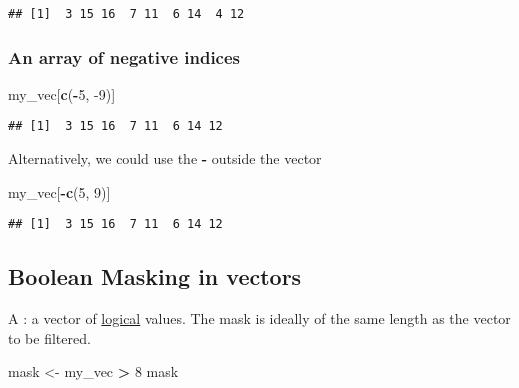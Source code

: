 \documentclass[]{book}
\newenvironment{Shaded}{\begin{snugshade}}{\end{snugshade}}
\newcommand{\DecValTok}[1]{\textcolor[rgb]{0.00,0.00,0.81}{#1}}
\newcommand{\KeywordTok}[1]{\textcolor[rgb]{0.13,0.29,0.53}{\textbf{#1}}}
\newcommand{\NormalTok}[1]{#1}
\newcommand{\OperatorTok}[1]{\textcolor[rgb]{0.81,0.36,0.00}{\textbf{#1}}}
\newcommand{\StringTok}[1]{\textcolor[rgb]{0.31,0.60,0.02}{#1}}
\begin{document}
\begin{verbatim}
## [1]  3 15 16  7 11  6 14  4 12
\end{verbatim}

\hypertarget{negvec}{%
\subsubsection*{An array of negative indices}\label{negvec}}

\begin{Shaded}
\begin{Highlighting}[]
\NormalTok{my_vec[}\KeywordTok{c}\NormalTok{(}\OperatorTok{-}\DecValTok{5}\NormalTok{, }\DecValTok{-9}\NormalTok{)]}
\end{Highlighting}
\end{Shaded}

\begin{verbatim}
## [1]  3 15 16  7 11  6 14 12
\end{verbatim}

Alternatively, we could use the \textbf{-} outside the vector

\begin{Shaded}
\begin{Highlighting}[]
\NormalTok{my_vec[}\OperatorTok{-}\KeywordTok{c}\NormalTok{(}\DecValTok{5}\NormalTok{, }\DecValTok{9}\NormalTok{)]}
\end{Highlighting}
\end{Shaded}

\begin{verbatim}
## [1]  3 15 16  7 11  6 14 12
\end{verbatim}

\hypertarget{booleanmasking}{%
\subsection*{Boolean Masking in vectors}\label{booleanmasking}}

A : a vector of \protect\hyperlink{logical}{logical} values. The mask is ideally of the same length as the vector to be filtered.

\begin{Shaded}
\begin{Highlighting}[]
\NormalTok{mask <-}\StringTok{ }\NormalTok{my_vec }\OperatorTok{>}\StringTok{ }\DecValTok{8}
\NormalTok{mask}
\end{Highlighting}
\end{Shaded}
\end{document}
